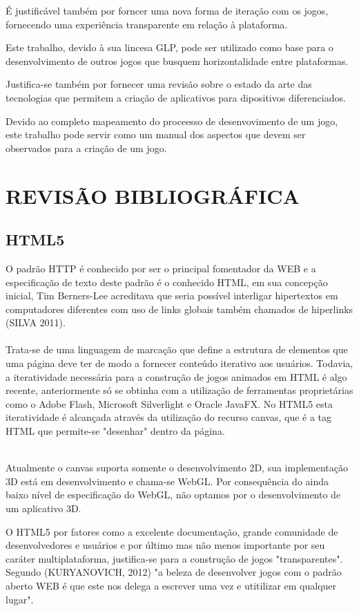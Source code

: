 \documentclass{article}
\begin{document}
É justificável também por forncer uma nova forma de iteração com os jogos, fornecendo uma experiência transparente em relação à plataforma.

Este trabalho, devido à sua lincesa GLP, pode ser utilizado como base para o desenvolvimento de outros jogos que busquem horizontalidade entre plataformas.

Justifica-se também por fornecer uma revisão sobre o estado da arte das tecnologias que permitem a criação de aplicativos para dipositivos diferenciados.

Devido ao completo mapeamento do proceesso de desenvovimento de um jogo, este trabalho pode servir como um manual dos aspectos que devem ser observados para a criação de um jogo.

\section{REVISÃO BIBLIOGRÁFICA}
\subsection{HTML5}

O padrão HTTP é conhecido por ser o principal fomentador da WEB e a especificação de texto deste padrão é o conhecido HTML, em sua concepção inicial, Tim Berners-Lee acreditava que seria possível  interligar hipertextos em computadores diferentes com uso de links globais também chamados de hiperlinks (SILVA 2011).
\\
\\ Trata-se de uma linguagem de marcação que define a estrutura de elementos que uma página deve ter de modo a fornecer conteúdo iterativo aos usuários. Todavia, a iteratividade necessária para a construção de jogos animados em HTML é algo recente, anteriormente só se obtinha com a utilização de ferramentas proprietárias como o Adobe Flash, Microsoft Silverlight e Oracle JavaFX.  No HTML5 esta iteratividade é alcançada através da utilização do recurso canvas, que é a tag HTML que permite-se "desenhar"  dentro da página. 

\\Atualmente o canvas suporta somente o desenvolvimento 2D, sua implementação 3D está em desenvolvimento e chama-se WebGL. Por consequência do ainda baixo nível de especificação do WebGL, não optamos por o desenvolvimento de um aplicativo 3D.

O HTML5 por fatores como a excelente documentação, grande comunidade de desenvolvedores e usuários e por último mas não menos importante por seu caráter multiplataforma, justifica-se para a construção de jogos "transparentes". Segundo (KURYANOVICH, 2012) "a beleza de desenvolver jogos com o padrão aberto WEB é que este nos delega a escrever uma vez e utitilizar em qualquer lugar".
\end{document}
